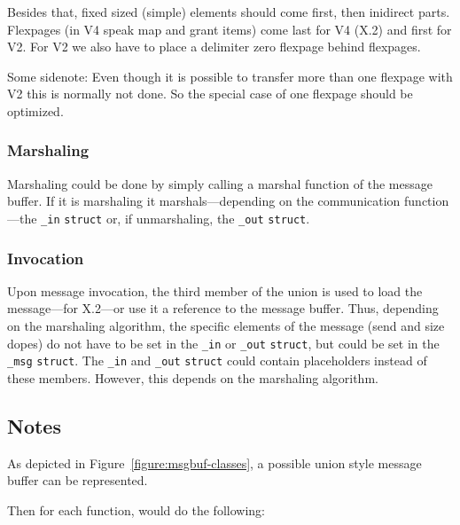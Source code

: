 Besides that, fixed sized (simple) elements should come first, then inidirect
parts. Flexpages (in V4 speak map and grant items) come last for V4 (X.2) and
first for V2.  For V2 we also have to place a delimiter zero flexpage behind
flexpages.

Some sidenote: Even though it is possible to transfer more than one flexpage
with V2 this is normally not done.  So the special case of one flexpage should
be optimized.

\subsubsection{Marshaling}

Marshaling could be done by simply calling a marshal function of the message
buffer.  If it is marshaling it marshals---depending on the communication
function---the \verb|_in| \verb|struct| or, if unmarshaling, the \verb|_out|
\verb|struct|.

\subsubsection{Invocation}

Upon message invocation, the third member of the union is used to load the
message---for X.2---or use it a reference to the message buffer.  Thus,
depending on the marshaling algorithm, the specific elements of the message
(send and size dopes) do not have to be set in the \verb|_in| or \verb|_out|
\verb|struct|, but could be set in the \verb|_msg| \verb|struct|.  The
\verb|_in| and \verb|_out| \verb|struct| could contain placeholders instead of
these members.  However, this depends on the marshaling algorithm.

\subsection{Notes}

As depicted in Figure~\ref{figure:msgbuf-classes}, a possible union style 
message buffer can be represented.

Then for each function, \dice{} would do the following:

